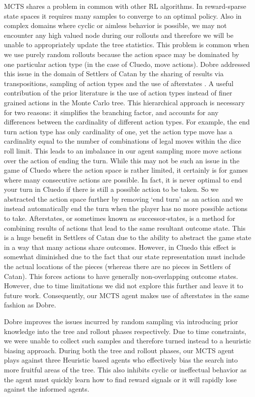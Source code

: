 \documentclass[msc, deptreport, ai, romanprepages]{infthesis}
\begin{document}
MCTS shares a problem in common with other RL algorithms. In reward-sparse state spaces it requires many samples to converge to an optimal policy. Also in complex domains where cyclic or aimless behavior is possible, we may not encounter any high valued node during our rollouts and therefore we will be unable to appropriately update the tree statistics. This problem is common when we use purely random rollouts because the action space may be dominated by one particular action type (in the case of Cluedo, move actions). Dobre addressed this issue in the domain of Settlers of Catan by the sharing of results via transpositions, sampling of action types and the use of afterstates \cite{Mihai}. A useful contribution of the prior literature is the use of action types instead of finer grained actions in the Monte Carlo tree. This hierarchical approach is necessary for two reasons: it simplifies the branching factor, and accounts for any differences between the cardinality of different action types. For example, the end turn action type has only cardinality of one, yet the action type move has a cardinality equal to the number of combinations of legal moves within the dice roll limit. This leads to an imbalance in our agent sampling more move actions over the action of ending the turn. While this may not be such an issue in the game of Cluedo where the action space is rather limited, it certainly is for games where many consecutive actions are possible. In fact, it is never optimal to end your turn in Cluedo if there is still a possible action to be taken. So we abstracted the action space further by removing ‘end turn’ as an action and we instead automatically end the turn when the player has no more possible actions to take. Afterstates, or sometimes known as successor-states, is a method for combining results of actions that lead to the same resultant outcome state. This is a huge benefit in Settlers of Catan due to the ability to abstract the game state in a way that many actions share outcomes. However, in Cluedo this effect is somewhat diminished due to the fact that our state representation must include the actual locations of the pieces (whereas there are no pieces in Settlers of Catan). This forces actions to have generally non-overlapping outcome states. However, due to time limitations we did not explore this further and leave it to future work. Consequently, our MCTS agent makes use of afterstates in the same fashion as Dobre.

Dobre improves the issues incurred by random sampling via introducing prior knowledge into the tree and rollout phases respectively. Due to time constraints, we were unable to collect such samples and therefore turned instead to a heuristic biasing approach. During both the tree and rollout phases, our MCTS agent plays against three Heuristic based agents who effectively bias the search into more fruitful areas of the tree. This also inhibits cyclic or ineffectual behavior as the agent must quickly learn how to find reward signals or it will rapidly lose against the informed agents.
\end{document}
